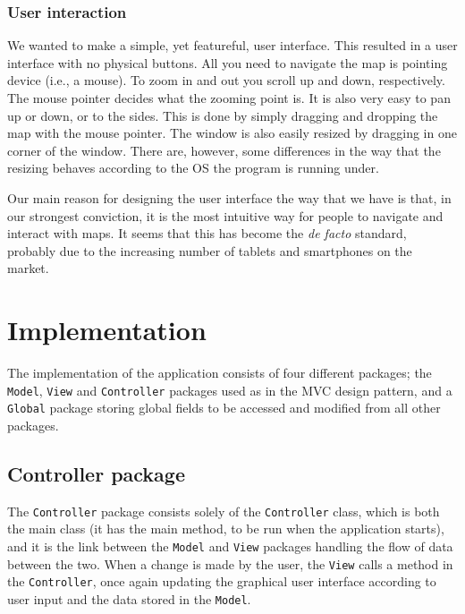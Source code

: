 \documentclass[a4paper,11pt]{article}
\begin{document}
\subsubsection{User interaction} %
\label{subsub:User interaction}
We wanted to make a simple, yet featureful, user interface. This resulted in a user interface with no physical buttons. All you need to navigate the map is pointing device (i.e., a mouse). To zoom in and out you scroll up and down, respectively. The mouse pointer decides what the zooming point is. It is also very easy to pan up or down, or to the sides. This is done by simply dragging and dropping the map with the mouse pointer. The window is also easily resized by dragging in one corner of the window. There are, however, some differences in the way that the resizing behaves according to the OS the program is running under.

Our main reason for designing the user interface the way that we have is that, in our strongest conviction, it is the most intuitive way for people to navigate and interact with maps. It seems that this has become the \textit{de facto} standard, probably due to the increasing number of tablets and smartphones on the market.

\pagebreak
\section{Implementation} %
\label{sec:Implementation} %
The implementation of the application consists of four different packages; the \texttt{Model}, \texttt{View} and \texttt{Controller} packages used as in the MVC design pattern, and a \texttt{Global} package storing global fields to be accessed and modified from all other packages.


\subsection{Controller package} %
The \texttt{Controller} package consists solely of the \texttt{Controller} class, which is both the main class (it has the main method, to be run when the application starts), and it is the link between the \texttt{Model} and \texttt{View} packages handling the flow of data between the two. When a change is made by the user, the \texttt{View} calls a method in the \texttt{Controller}, once again updating the graphical user interface according to user input and the data stored in the \texttt{Model}.
\end{document}
